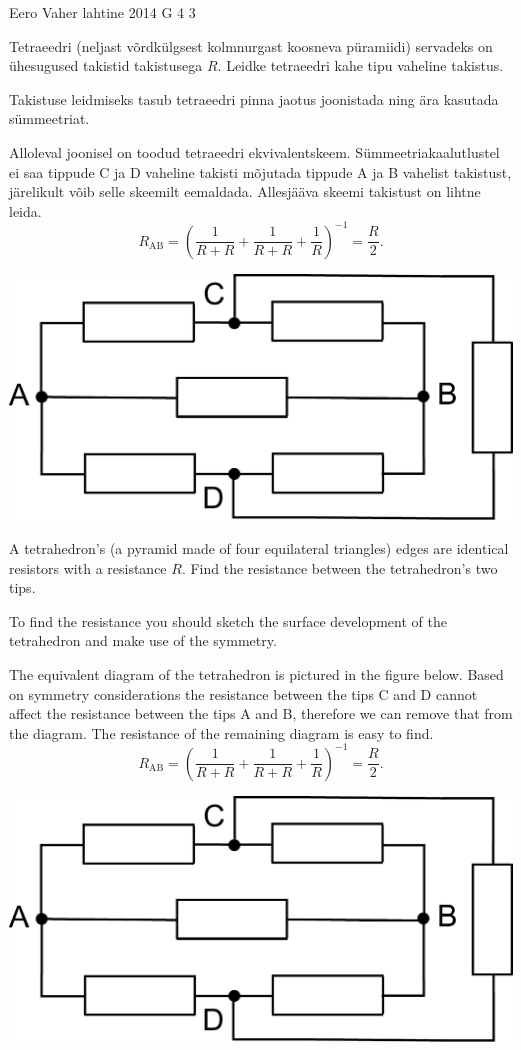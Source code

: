 {Eero Vaher} %
{lahtine} %
{2014} %
{G 4} %
{3} %
{
\ifStatement
Tetraeedri (neljast võrdkülgsest kolmnurgast koosneva püramiidi) servadeks on ühesugused takistid takistusega $R$. Leidke tetraeedri kahe tipu vaheline takistus.
\fi


\ifHint
Takistuse leidmiseks tasub tetraeedri pinna jaotus joonistada ning ära kasutada sümmeetriat.
\fi


\ifSolution
Alloleval joonisel on toodud tetraeedri ekvivalentskeem. Sümmeetriakaalutlustel ei saa tippude C ja D vaheline takisti mõjutada tippude A ja B vahelist takistust, järelikult võib selle skeemilt eemaldada. Allesjääva skeemi takistust on lihtne leida.
\[R_\text{AB}=\left(\frac{1}{R+R}+\frac{1}{R+R}+\frac{1}{R}\right)^{-1}=\frac{R}{2}.\]
\begin{center}
\includegraphics[width=0.6\linewidth]{2014-lahg-04-skeem}
\end{center}
\fi


\ifEngStatement
A tetrahedron’s (a pyramid made of four equilateral triangles) edges are identical resistors with a resistance $R$. Find the resistance between the tetrahedron’s two tips.
\fi


\ifEngHint
To find the resistance you should sketch the surface development of the tetrahedron and make use of the symmetry.
\fi


\ifEngSolution
The equivalent diagram of the tetrahedron is pictured in the figure below. Based on symmetry considerations the resistance between the tips C and D cannot affect the resistance between the tips A and B, therefore we can remove that from the diagram. The resistance of the remaining diagram is easy to find.
\[R_\text{AB}=\left(\frac{1}{R+R}+\frac{1}{R+R}+\frac{1}{R}\right)^{-1}=\frac{R}{2}.\]
\begin{center}
\includegraphics[width=0.6\linewidth]{2014-lahg-04-skeem}
\end{center}
\fi
}
